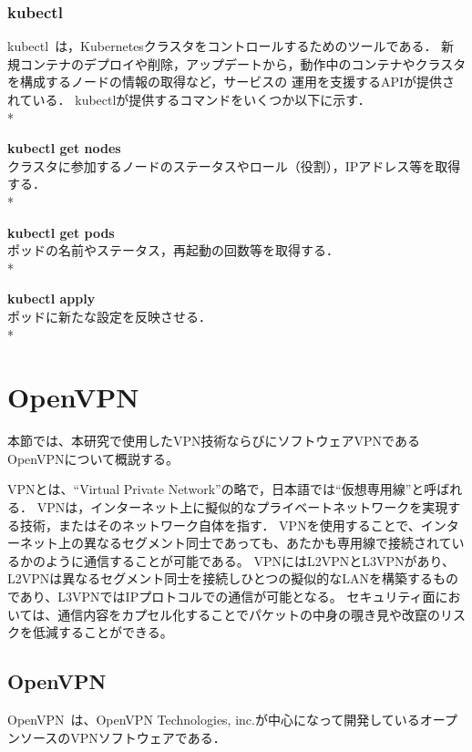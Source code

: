 \subsubsection{kubectl}
\label{background:container-orchestration-system:kubernetes:kubectl}

kubectl~\cite{kubectl}は，Kubernetesクラスタをコントロールするためのツールである．
新規コンテナのデプロイや削除，アップデートから，動作中のコンテナやクラスタを構成するノードの情報の取得など，サービスの
運用を支援するAPIが提供されている．
kubectlが提供するコマンドをいくつか以下に示す．\\*

{\bf kubectl get nodes}\\
クラスタに参加するノードのステータスやロール（役割），IPアドレス等を取得する．\\*

{\bf kubectl get pods}\\
ポッドの名前やステータス，再起動の回数等を取得する．\\*

{\bf kubectl apply}\\
ポッドに新たな設定を反映させる．\\*

\section{OpenVPN}
\label{background:openvpn}

本節では、本研究で使用したVPN技術ならびにソフトウェアVPNであるOpenVPNについて概説する。

VPNとは、``Virtual Private Network''の略で，日本語では``仮想専用線''と呼ばれる．
VPNは，インターネット上に擬似的なプライベートネットワークを実現する技術，またはそのネットワーク自体を指す．
VPNを使用することで、インターネット上の異なるセグメント同士であっても、あたかも専用線で接続されているかのように通信することが可能である。
VPNにはL2VPNとL3VPNがあり、L2VPNは異なるセグメント同士を接続しひとつの擬似的なLANを構築するものであり、L3VPNではIPプロトコルでの通信が可能となる。
セキュリティ面においては、通信内容をカプセル化することでパケットの中身の覗き見や改竄のリスクを低減することができる。

\subsection{OpenVPN}

OpenVPN~\cite{OpenVPN}は、OpenVPN Technologies, inc.が中心になって開発しているオープンソースのVPNソフトウェアである．

